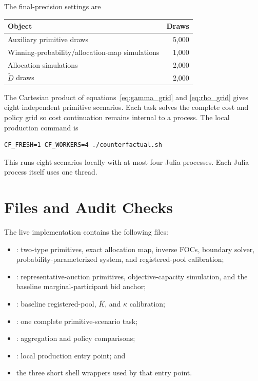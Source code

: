 \documentclass[10pt]{article}
\begin{document}
The final-precision settings are
\begin{center}
\begin{tabular}{lr}
\toprule
Object & Draws\\
\midrule
Auxiliary primitive draws & 5,000\\
Winning-probability/allocation-map simulations & 1,000\\
Allocation simulations & 2,000\\
$\widetilde D$ draws & 2,000\\
\bottomrule
\end{tabular}
\end{center}
The Cartesian product of equations~\eqref{eq:gamma_grid} and
\eqref{eq:rho_grid} gives eight independent primitive scenarios.  Each task
solves the complete cost and policy grid so cost continuation remains internal
to a process.  The local production command is
\begin{verbatim}
CF_FRESH=1 CF_WORKERS=4 ./counterfactual.sh
\end{verbatim}
This runs eight scenarios locally with at most four Julia processes.  Each
Julia process itself uses one thread.

\section{Files and Audit Checks}

The live implementation contains the following files:
\begin{itemize}[leftmargin=2em]
\item {}: two-type primitives, exact allocation
map, inverse FOCs, boundary solver, probability-parameterized system, and
registered-pool calibration;
\item {}: representative-auction primitives,
objective-capacity simulation, and the baseline marginal-participant bid
anchor;
\item {}: baseline registered-pool, $\overline
K$, and $\kappa$ calibration;
\item {}: one complete primitive-scenario task;
\item {}: aggregation and policy comparisons;
\item {}: local production entry point; and
\item the three short shell wrappers used by that entry point.
\end{itemize}
\end{document}
